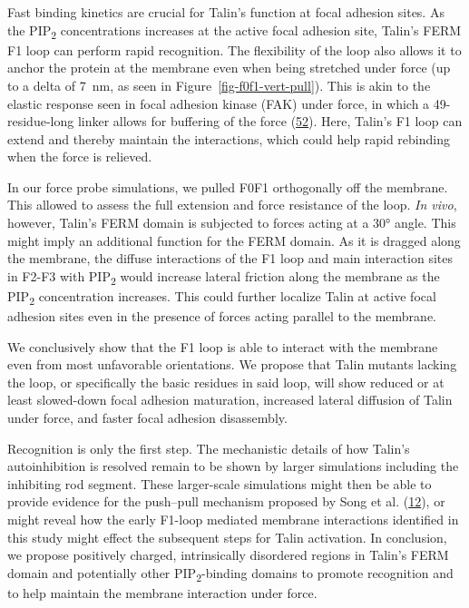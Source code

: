 \documentclass[
  twocolumn]{biophys-new-mod}
\begin{document}
Fast binding kinetics are crucial for Talin's function at focal adhesion
sites. As the PIP\textsubscript{2} concentrations increases at the
active focal adhesion site, Talin's FERM F1 loop can perform rapid
recognition. The flexibility of the loop also allows it to anchor the
protein at the membrane even when being stretched under force (up to a
delta of 7~nm, as seen in Figure~\ref{fig-f0f1-vert-pull}). This is akin
to the elastic response seen in focal adhesion kinase (FAK) under force,
in which a 49-residue-long linker allows for buffering of the force
(\protect\hyperlink{ref-bauerStructuralMechanisticInsights2019}{52}).
Here, Talin's F1 loop can extend and thereby maintain the interactions,
which could help rapid rebinding when the force is relieved.

In our force probe simulations, we pulled F0F1 orthogonally off the
membrane. This allowed to assess the full extension and force
resistance of the loop. \emph{In vivo}, however, Talin's FERM domain is
subjected to forces acting at a 30° angle. This might imply an
additional function for the FERM domain. As it is dragged along the
membrane, the diffuse interactions of the F1 loop and main interaction
sites in F2-F3 with PIP\textsubscript{2} would increase lateral friction
along the membrane as the PIP\textsubscript{2} concentration increases.
This could further localize Talin at active focal adhesion sites even in
the presence of forces acting parallel to the membrane.

We conclusively show that the F1 loop is able to interact with the
membrane even from most unfavorable orientations. We propose that Talin
mutants lacking the loop, or specifically the basic residues in said
loop, will show reduced or at least slowed-down focal adhesion
maturation, increased lateral diffusion of Talin under force, and faster
focal adhesion disassembly.

Recognition is only the first step. The mechanistic details of
how Talin's autoinhibition is resolved remain to be shown by larger
simulations including the inhibiting rod segment. These larger-scale
simulations might then be able to provide evidence for the push--pull
mechanism proposed by Song et al.
(\protect\hyperlink{ref-songNovelMembranedependentSwitch2012a}{12}), or might reveal how the early F1-loop mediated membrane interactions identified in this study might effect the subsequent steps for Talin activation. In conclusion, we propose positively charged,
intrinsically disordered regions in Talin's FERM domain and potentially
other PIP\textsubscript{2}-binding domains to promote recognition and to
help maintain the membrane interaction under force.
\end{document}
